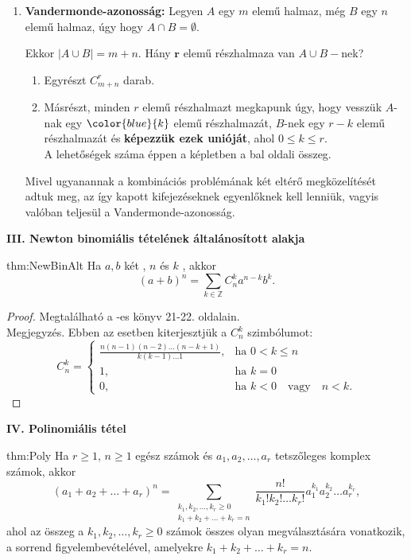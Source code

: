 \begin{enumerate}
\begin{enumerate}
\item \textbf{Vandermonde-azonosság:} Legyen $A$ egy $m$ elemű halmaz,
még $B$ egy $n$ elemű halmaz, úgy hogy $A\cap B=\emptyset$.

Ekkor $|A\cup B|=m+n$. Hány $\textbf{r}$ elemű részhalmaza van $A\cup B-$nek? 
\begin{enumerate}
\item Egyrészt $C_{m+n}^{r}$ darab. 
\item Másrészt, minden $r$ elemű részhalmazt megkapunk úgy, hogy {\color{ccqqqq}{összes
lehetséges módon}} vesszük $A$-nak egy ${\color{blue}{k}}$ elemű
részhalmazát, $B$-nek egy $r-k$ elemű részhalmazát és \textbf{képezzük
ezek unióját}, ahol $0\leq k\leq r$. \\
 A lehetőségek száma éppen a képletben a bal oldali összeg. 
\end{enumerate}
Mivel ugyanannak a kombinációs problémának két eltérő megközelítését
adtuk meg, az így kapott kifejezéseknek egyenlőknek kell lenniük,
vagyis valóban teljesül a Vandermonde-azonosság. 
\end{enumerate}
\end{enumerate}

\textbf{III. Newton binomiális tételének általánosított alakja}
\begin{theorem}{thm:NewBinAlt}
Ha $a,b$ két {\color{ccqqqq}{valós szám}}, $n$ {\color{ccqqqq}{VALÓS
szám}} és $k$ {\color{ccqqqq}{egész szám}}, akkor 
\[
(a+b)^{n}=\sum_{k\in\mathbb{Z}}C_{n}^{k}a^{n-k}b^{k}.
\]
\end{theorem}

\begin{proof}
Megtalálható a \cite{a3}-es könyv 21-22. oldalain. \\
 Megjegyzés. Ebben az esetben kiterjesztjük a $C_{n}^{k}$ szimbólumot:
\[
C_{n}^{k}=\begin{cases}
\frac{n(n-1)(n-2)\dots(n-k+1)}{k(k-1)\dots1}, & \text{ha }0<k\leq n\\
1, & \text{ha }k=0\\
0, & \text{ha }k<0\quad\text{vagy}\quad n<k.
\end{cases}
\]
\end{proof}
\textbf{IV. Polinomiális tétel}
\begin{theorem}{thm:Poly}
Ha $r\geq1$, $n\geq1$ egész számok és $a_{1},a_{2},\dots,a_{r}$
tetszőleges komplex számok, akkor
\[
(a_{1}+a_{2}+\dots+a_{r})^{n}=\sum_{\substack{k_{1},k_{2},\dots,k_{r}\geq0\\
k_{1}+k_{2}+\dots+k_{r}=n
}
}\frac{n!}{k_{1}!k_{2}!\dots k_{r}!}a_{1}^{k_{1}}a_{2}^{k_{2}}\dots a_{r}^{k_{r}},
\]
ahol az összeg a $k_{1},k_{2},\dots,k_{r}\geq0$ számok összes olyan
megválasztására vonatkozik, a sorrend figyelembevételével, amelyekre
$k_{1}+k_{2}+\dots+k_{r}=n$. 
\end{theorem}

